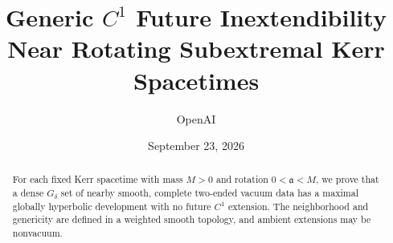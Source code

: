 \documentclass[11pt]{article}
\title{Generic \(C^1\) Future Inextendibility\\
Near Rotating Subextremal Kerr Spacetimes}
\author{OpenAI}
\date{September 23, 2026}
\numberwithin{equation}{section}
\theoremstyle{definition}
\theoremstyle{remark}
\begin{document}
\maketitle
\begin{abstract}
For each fixed Kerr spacetime with mass \(M>0\) and rotation
\(0<\mathfrak a<M\), we prove that a dense \(G_\delta\) set of nearby smooth,
complete two-ended vacuum data has a maximal globally hyperbolic
development with no future \(C^1\) extension. The neighborhood and
genericity are defined in a weighted smooth topology, and ambient
extensions may be nonvacuum.
\end{abstract}
\tableofcontents









\appendix

\renewcommand{\bibfont}{\raggedright}


\end{document}
